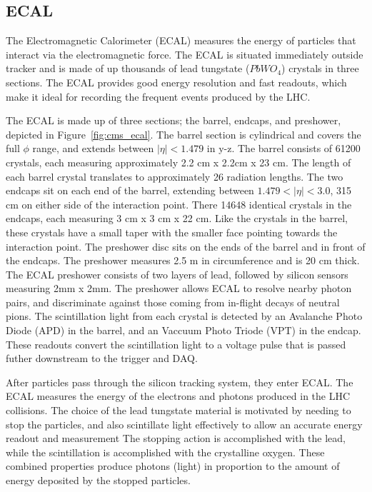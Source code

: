 \subsection{ECAL}
The Electromagnetic Calorimeter (ECAL) measures the energy of particles that interact via the electromagnetic force. The ECAL is situated immediately outside tracker
and is made of up thousands of lead tungstate ($PbWO_{4}$) crystals in three sections. The ECAL provides good energy resolution and fast readouts,
which make it ideal for recording the frequent events produced by the LHC. 

The ECAL is made up of three sections; the barrel, endcaps, and preshower, depicted in Figure~\ref{fig:cms_ecal}. The barrel section is cylindrical and covers the full $\phi$
range, and extends between $|\eta| < 1.479$ in y-z. The barrel consists of 61200 crystals, each measuring approximately 2.2 cm x 2.2cm x 23 cm. The length of each barrel
crystal translates to approximately 26 radiation lengths. The two endcaps sit on each end of the barrel, extending between $1.479 < |\eta|< 3.0$, 315 cm on either side of
the interaction point. There 14648 identical crystals in the endcaps, each measuring 3 cm x 3 cm x 22 cm. Like the crystals in the barrel, these crystals have a small taper
with the smaller face pointing towards the interaction point. The preshower disc sits on the ends of the barrel and in front of the endcaps. The preshower measures 2.5 m in
circumference and is 20 cm thick. The ECAL preshower consists of two layers
of lead, followed by silicon sensors measuring 2mm x 2mm. The preshower allows ECAL to resolve nearby photon pairs, and discriminate against those coming from in-flight decays
of neutral pions. The scintillation light from each crystal is detected by an Avalanche Photo Diode (APD) in the barrel, and an Vaccuum Photo Triode (VPT) in the endcap.
These readouts convert the scintillation light to a voltage pulse that is passed futher downstream to the trigger and DAQ. 

After particles pass through the silicon tracking system, they enter ECAL. The ECAL measures the energy of the electrons and photons produced in the LHC collisions.
The choice of the lead tungstate material is motivated by needing to stop the particles, and also scintillate light effectively to allow an accurate energy readout and measurement
The stopping action is accomplished with the lead, while the scintillation is accomplished with
the crystalline oxygen. These combined properties produce photons (light) in proportion to the amount of energy deposited by the stopped particles.


